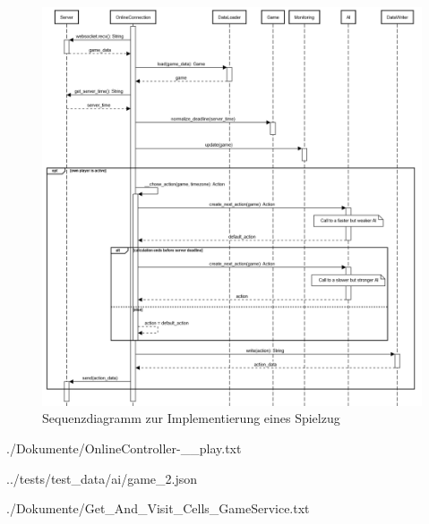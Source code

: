 \begin{figure}[htb]
	\centering
	\includegraphics[width=\textwidth]{Bilder/Sequenzdiagramm_Implementierung_Spielzug.png}
	\caption{Sequenzdiagramm zur Implementierung eines Spielzug}
	\label{fig:sequenzdiagramm-spielzug}
\end{figure}

\begin{minipage}{\textwidth}
	
	{./Dokumente/OnlineController-__play.txt}
\end{minipage}

\begin{minipage}{\textwidth}
	
	{../tests/test_data/ai/game_2.json}
\end{minipage}

\begin{minipage}{\textwidth}
	
	{./Dokumente/Get_And_Visit_Cells_GameService.txt}
\end{minipage}

